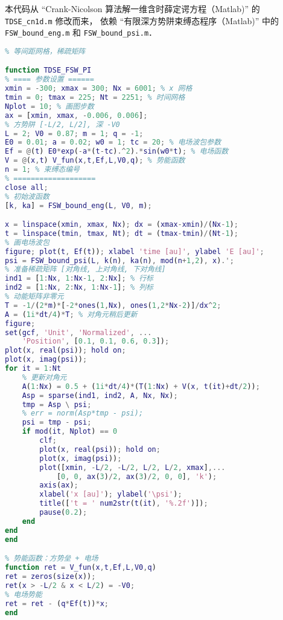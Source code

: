 本代码从 “Crank-Nicolson 算法解一维含时薛定谔方程（Matlab)” 的 \verb|TDSE_cn1d.m| 修改而来， 依赖 “有限深方势阱束缚态程序（Matlab)” 中的 \verb|FSW_bound_eng.m| 和 \verb|FSW_bound_psi.m|．
\begin{lstlisting}[language=matlab]
% 一维有限深方势阱中的光电离模拟
% 等间距网格，稀疏矩阵

function TDSE_FSW_PI
% ==== 参数设置 ======
xmin = -300; xmax = 300; Nx = 6001; % x 网格
tmin = 0; tmax = 225; Nt = 2251; % 时间网格
Nplot = 10; % 画图步数
ax = [xmin, xmax, -0.006, 0.006];
% 方势阱 [-L/2, L/2], 深 -V0
L = 2; V0 = 0.87; m = 1; q = -1;
E0 = 0.01; a = 0.02; w0 = 1; tc = 20; % 电场波包参数
Ef = @(t) E0*exp(-a*(t-tc).^2).*sin(w0*t); % 电场函数
V = @(x,t) V_fun(x,t,Ef,L,V0,q); % 势能函数
n = 1; % 束缚态编号
% ===================
close all;
% 初始波函数
[k, ka] = FSW_bound_eng(L, V0, m);

x = linspace(xmin, xmax, Nx); dx = (xmax-xmin)/(Nx-1);
t = linspace(tmin, tmax, Nt); dt = (tmax-tmin)/(Nt-1);
% 画电场波包
figure; plot(t, Ef(t)); xlabel 'time [au]', ylabel 'E [au]';
psi = FSW_bound_psi(L, k(n), ka(n), mod(n+1,2), x).';
% 准备稀疏矩阵 [对角线, 上对角线, 下对角线]
ind1 = [1:Nx, 1:Nx-1, 2:Nx]; % 行标
ind2 = [1:Nx, 2:Nx, 1:Nx-1]; % 列标
% 动能矩阵非零元
T = -1/(2*m)*[-2*ones(1,Nx), ones(1,2*Nx-2)]/dx^2;
A = (1i*dt/4)*T; % 对角元稍后更新
figure;
set(gcf, 'Unit', 'Normalized', ...
    'Position', [0.1, 0.1, 0.6, 0.3]);
plot(x, real(psi)); hold on;
plot(x, imag(psi));
for it = 1:Nt
    % 更新对角元
    A(1:Nx) = 0.5 + (1i*dt/4)*(T(1:Nx) + V(x, t(it)+dt/2));
    Asp = sparse(ind1, ind2, A, Nx, Nx);
    tmp = Asp \ psi;
    % err = norm(Asp*tmp - psi);
    psi = tmp - psi;
    if mod(it, Nplot) == 0
        clf;
        plot(x, real(psi)); hold on;
        plot(x, imag(psi));
        plot([xmin, -L/2, -L/2, L/2, L/2, xmax],...
            [0, 0, ax(3)/2, ax(3)/2, 0, 0], 'k');
        axis(ax);
        xlabel('x [au]'); ylabel('\psi');
        title(['t = ' num2str(t(it), '%.2f')]);
        pause(0.2);
    end
end
end

% 势能函数：方势垒 + 电场
function ret = V_fun(x,t,Ef,L,V0,q)
ret = zeros(size(x));
ret(x > -L/2 & x < L/2) = -V0;
% 电场势能
ret = ret - (q*Ef(t))*x;
end
\end{lstlisting}
